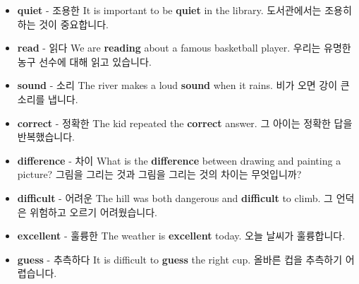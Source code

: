 \documentclass{article}
\begin{document}
\begin{addmargin}[1em]{1em}
\begin{itemize}
        \item \fontsize{12pt}{14pt}\selectfont \textbf{quiet} - 조용한 \newline
        It is important to be \textbf{quiet} in the library. \newline
        도서관에서는 조용히 하는 것이 중요합니다.
        
        \item \fontsize{12pt}{14pt}\selectfont \textbf{read} - 읽다 \newline
        We are \textbf{reading} about a famous basketball player. \newline
        우리는 유명한 농구 선수에 대해 읽고 있습니다.
        
        \item \fontsize{12pt}{14pt}\selectfont \textbf{sound} - 소리 \newline
        The river makes a loud \textbf{sound} when it rains. \newline
        비가 오면 강이 큰 소리를 냅니다.
        
        \item \fontsize{12pt}{14pt}\selectfont \textbf{correct} - 정확한 \newline
        The kid repeated the \textbf{correct} answer. \newline
        그 아이는 정확한 답을 반복했습니다.
        
        \item \fontsize{12pt}{14pt}\selectfont \textbf{difference} - 차이 \newline
        What is the \textbf{difference} between drawing and painting a picture? \newline
        그림을 그리는 것과 그림을 그리는 것의 차이는 무엇입니까?
        
        \item \fontsize{12pt}{14pt}\selectfont \textbf{difficult} - 어려운 \newline
        The hill was both dangerous and \textbf{difficult} to climb. \newline
        그 언덕은 위험하고 오르기 어려웠습니다.
        
        \item \fontsize{12pt}{14pt}\selectfont \textbf{excellent} - 훌륭한 \newline
        The weather is \textbf{excellent} today. \newline
        오늘 날씨가 훌륭합니다.
        
        \item \fontsize{12pt}{14pt}\selectfont \textbf{guess} - 추측하다 \newline
        It is difficult to \textbf{guess} the right cup. \newline
        올바른 컵을 추측하기 어렵습니다.
        

\end{itemize}
\end{addmargin}
\end{document}
